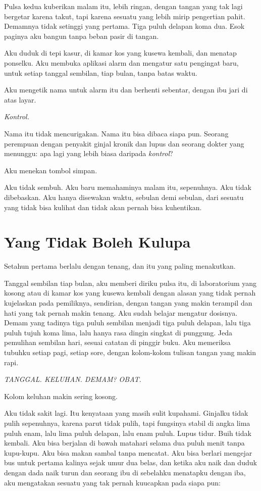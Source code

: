 \documentclass[11pt,twoside,openany]{book}
\begin{document}
Pulsa kedua kuberikan malam itu, lebih ringan, dengan tangan yang tak lagi bergetar karena takut, tapi karena sesuatu yang lebih mirip pengertian pahit. Demamnya tidak setinggi yang pertama. Tiga puluh delapan koma dua. Esok paginya aku bangun tanpa beban pasir di tangan.

Aku duduk di tepi kasur, di kamar kos yang kusewa kembali, dan menatap ponselku. Aku membuka aplikasi alarm dan mengatur satu pengingat baru, untuk setiap tanggal sembilan, tiap bulan, tanpa batas waktu.

Aku mengetik nama untuk alarm itu dan berhenti sebentar, dengan ibu jari di atas layar.

\emph{Kontrol.}

Nama itu tidak mencurigakan. Nama itu bisa dibaca siapa pun. Seorang perempuan dengan penyakit ginjal kronik dan lupus dan seorang dokter yang menunggu: apa lagi yang lebih biasa daripada \emph{kontrol}?

Aku menekan tombol simpan.

Aku tidak sembuh. Aku baru memahaminya malam itu, sepenuhnya. Aku tidak dibebaskan. Aku hanya disewakan waktu, sebulan demi sebulan, dari sesuatu yang tidak bisa kulihat dan tidak akan pernah bisa kuhentikan.

\chapter{Yang Tidak Boleh Kulupa}
Setahun pertama berlalu dengan tenang, dan itu yang paling menakutkan.

Tanggal sembilan tiap bulan, aku memberi diriku pulsa itu, di laboratorium yang kosong atau di kamar kos yang kusewa kembali dengan alasan yang tidak pernah kujelaskan pada pemiliknya, sendirian, dengan tangan yang makin terampil dan hati yang tak pernah makin tenang. Aku sudah belajar mengatur dosisnya. Demam yang tadinya tiga puluh sembilan menjadi tiga puluh delapan, lalu tiga puluh tujuh koma lima, lalu hanya rasa dingin singkat di punggung. Jeda pemulihan sembilan hari, sesuai catatan di pinggir buku. Aku memeriksa tubuhku setiap pagi, setiap sore, dengan kolom-kolom tulisan tangan yang makin rapi.

\emph{TANGGAL. KELUHAN. DEMAM? OBAT.}

Kolom keluhan makin sering kosong.

Aku tidak sakit lagi. Itu kenyataan yang masih sulit kupahami. Ginjalku tidak pulih sepenuhnya, karena parut tidak pulih, tapi fungsinya stabil di angka lima puluh enam, lalu lima puluh delapan, lalu enam puluh. Lupus tidur. Buih tidak kembali. Aku bisa berjalan di bawah matahari selama dua puluh menit tanpa kupu-kupu. Aku bisa makan sambal tanpa mencatat. Aku bisa berlari mengejar bus untuk pertama kalinya sejak umur dua belas, dan ketika aku naik dan duduk dengan dada naik turun dan seorang ibu di sebelahku menatapku dengan iba, aku mengatakan sesuatu yang tak pernah kuucapkan pada siapa pun:
\end{document}
